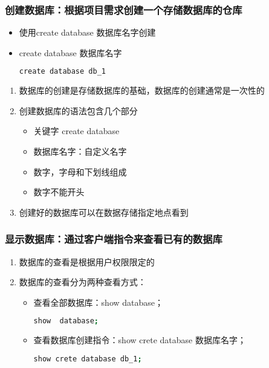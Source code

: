 \subsubsection{创建数据库：根据项目需求创建一个存储数据库的仓库}
\begin{itemize}

\item 使用create database 数据库名字创建
\item create database 数据库名字
\begin{lstlisting}[language=bash]
create database db_1
\end{lstlisting}

\end{itemize}
\begin{enumerate}
\item 数据库的创建是存储数据库的基础，数据库的创建通常是一次性的
\item 创建数据库的语法包含几个部分
\begin{itemize}
\item 关键字 create database
\item 数据库名字：自定义名字
\item  数字，字母和下划线组成
\item 数字不能开头
\end{itemize}
\item  创建好的数据库可以在数据存储指定地点看到



\end{enumerate}

\subsubsection{显示数据库：通过客户端指令来查看已有的数据库}
\begin{enumerate}
\item 数据库的查看是根据用户权限限定的
\item 数据库的查看分为两种查看方式：
\begin{itemize}
\item 查看全部数据库：show database；
\begin{lstlisting}[language=bash]
show  database;
\end{lstlisting}
\item 查看数据库创建指令：show crete database 数据库名字；
\begin{lstlisting}[language=bash]
show crete database db_1;
\end{lstlisting}
\end{itemize}

\end{enumerate}


